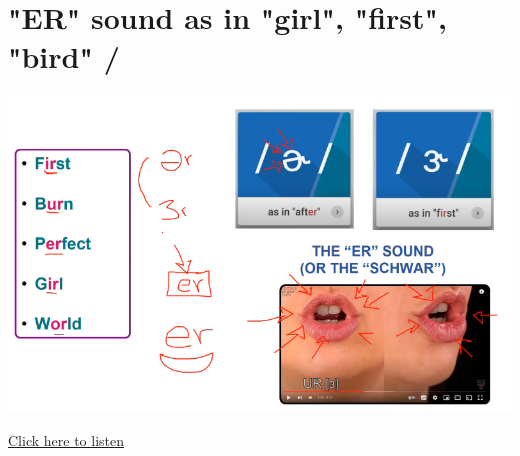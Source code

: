 \section{"ER" sound as in "girl", "first", "bird" \textipa{/\textschwa\textturnr}/}
\begin{center}
\includegraphics[width=1\textwidth]{images/er_portrait.png}
\end{center}

\href{https://drive.google.com/file/d/1c1VYP8y_y8aZ3aMOANftbIooVzKmxFav/view?usp=sharing}{Click here to listen}

